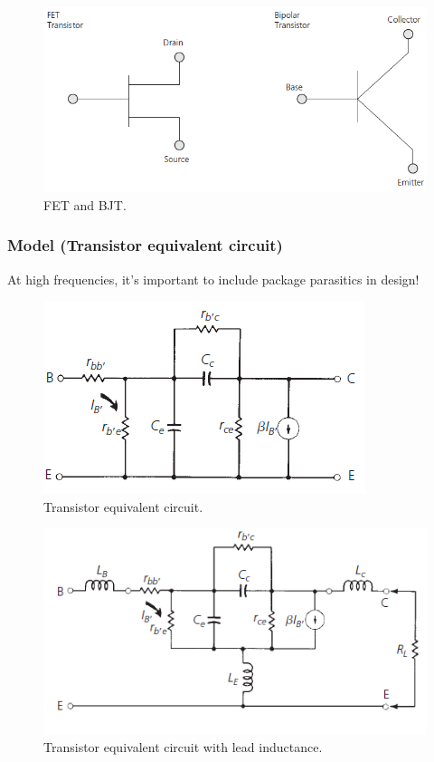 \begin{figure} [H]
	\centering
	\includegraphics[width=0.8\linewidth]{graphics/31.png}
	\caption{FET and BJT.}
	\label{fig:31}
\end{figure}

\subsubsection{Model (Transistor equivalent circuit)}
At high frequencies, it's important to include package parasitics in design!

\begin{figure} [H]
	\centering
	\includegraphics[width=0.6\linewidth]{graphics/32.png}
	\caption{Transistor equivalent circuit.}
	\label{fig:32}
\end{figure}

\begin{figure} [H]
	\centering
	\includegraphics[width=0.8\linewidth]{graphics/33.png}
	\caption{Transistor equivalent circuit with lead inductance.}
	\label{fig:33}
\end{figure}

